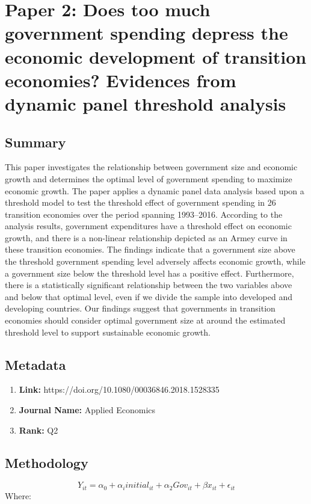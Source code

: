 \documentclass[10pt, oneside]{article}
\begin{document}
\section{Paper 2: Does too much government spending depress the
  economic development of transition economies?
  Evidences from dynamic panel threshold analysis}

\subsection{Summary}
This paper investigates the relationship between government size and economic growth and
determines the optimal level of government spending to maximize economic growth. The paper
applies a dynamic panel data analysis based upon a threshold model to test the threshold effect
of government spending in 26 transition economies over the period spanning 1993–2016.
According to the analysis results, government expenditures have a threshold effect on economic
growth, and there is a non-linear relationship depicted as an Armey curve in these transition
economies. The findings indicate that a government size above the threshold government
spending level adversely affects economic growth, while a government size below the threshold
level has a positive effect. Furthermore, there is a statistically significant relationship between the
two variables above and below that optimal level, even if we divide the sample into developed
and developing countries. Our findings suggest that governments in transition economies should
consider optimal government size at around the estimated threshold level to support sustainable
economic growth.\cite{aydin2019does}

\subsection{Metadata}
\begin{enumerate}
	\item \textbf{Link:} https://doi.org/10.1080/00036846.2018.1528335
	\item \textbf{Journal Name:} Applied Economics
	\item \textbf{Rank:} Q2
\end{enumerate}

\subsection{Methodology}

$$
	Y_{it} = \alpha_0 + \alpha_i initial_{it} + \alpha_2 Gov_{it} + \beta x_{it} + \epsilon_{it}
$$
Where:
\end{document}
